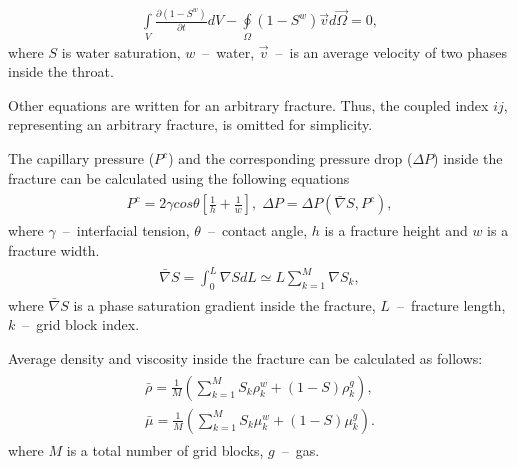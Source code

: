\documentclass[a4paper,12pt]{extreport}
\begin{document}
  \begin{eqnarray}
  \label{eq:twophase_integral_g}
  \int \limits_{V} \frac{\partial \left(1-S^w\right)}{\partial t} d V - \oint \limits_{\Omega} \left(1-S^w\right) \vec{v} d\vec{\Omega} = 0,
  \end{eqnarray}
  where  $S$ is water saturation, $w$~--~water, $\vec{v}$~--~is an average velocity of two phases inside the throat. 
  
  Other equations are written for an arbitrary fracture. Thus, the coupled index $ij$, representing an arbitrary fracture, is omitted for simplicity.
 
 The capillary pressure ($P^c$)  and the corresponding pressure drop ($\Delta P$) inside the fracture can be calculated using the following equations
  \begin{eqnarray}
  \begin{gathered}
  \label{eq:twophase_capillary_pressure_fractures}
  P^{c} = 2 \gamma cos \theta \left[\frac{1}{h} + \frac{1}{w}\right], \; \Delta P = \Delta P \left(\bar{\nabla} S, P^c\right),
  \end{gathered}
  \end{eqnarray}
  where $\gamma$~--~interfacial tension, $\theta$~--~contact angle, $h$ is a fracture height and $w$ is a fracture width.
  \begin{eqnarray}
  \label{eq:twophase_av_saturation_grad}
  \begin{gathered}
  \bar{\nabla} S = \int_{0}^{L} \nabla S dL \simeq L \sum_{k=1}^{M} \nabla S_{k},
  \end{gathered}
  \end{eqnarray}
 where $\bar{\nabla} S$ is a phase saturation gradient inside the fracture, $L$~--~fracture length, $k$~--~grid block index.
 
 
Average density and viscosity inside the fracture can be calculated as follows:
  \begin{eqnarray}
  \label{eq:twophase_dens_visc}
  \begin{gathered}
  \bar{\rho} = \frac{1}{M}\left(\sum_{k=1}^M S_{k} \rho_k^w+ \left(1-S\right) \rho_k^g\right), \\
  \bar{\mu} = \frac{1}{M}\left(\sum_{k=1}^M S_{k} \mu_k^w+ \left(1-S\right) \mu_k^g\right).
  \end{gathered}
  \end{eqnarray}
  where $M$ is a total number of grid blocks, $g$~--~gas. 
\end{document}
